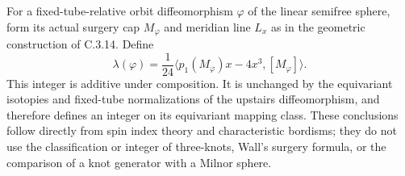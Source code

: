 \begin{proposition}
For a fixed-tube-relative orbit diffeomorphism $\varphi$ of the
linear semifree sphere, form its actual surgery cap $M_\varphi$
and meridian line $L_x$ as in the geometric construction of
C.3.14. Define
\[
 \lambda(\varphi)=\frac{1}{24}
      \langle p_1(M_\varphi)x-4x^3,[M_\varphi]\rangle.
\]
This integer is additive under composition. It is unchanged by
the equivariant isotopies and fixed-tube normalizations of the
upstairs diffeomorphism, and therefore defines an integer on its
equivariant mapping class. These conclusions follow directly
from spin index theory and characteristic bordisms; they do not
use the classification or integer of three-knots, Wall's surgery
formula, or the comparison of a knot generator with a Milnor sphere.
\end{proposition}
